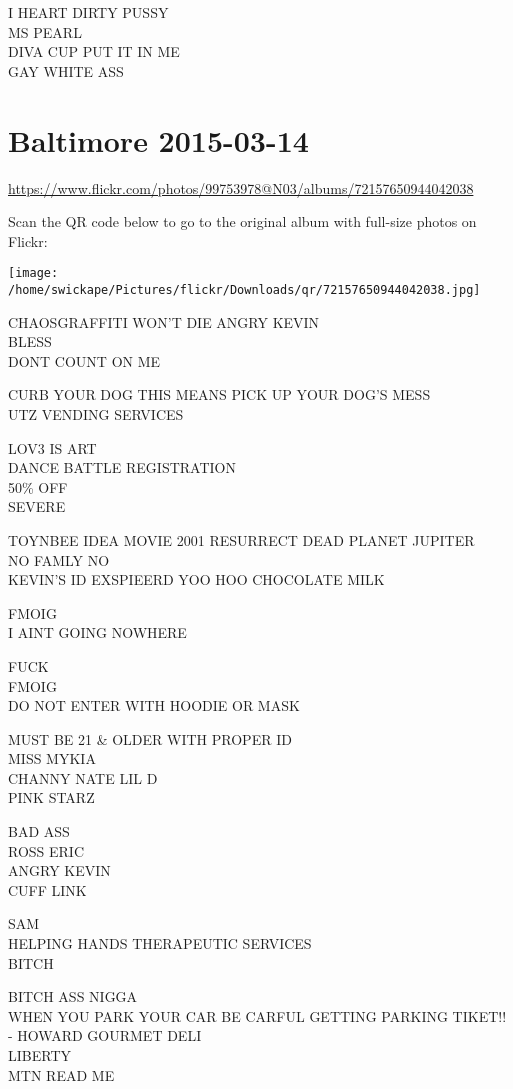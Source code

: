 \documentclass[10pt,letterpaper]{article}
\begin{document}
I HEART DIRTY PUSSY\\
MS PEARL\\
DIVA CUP PUT IT IN ME\\
GAY WHITE ASS
\pagebreak

\section*{Baltimore 2015-03-14}

\url{https://www.flickr.com/photos/99753978@N03/albums/72157650944042038}

Scan the QR code below to go to the original album with full-size photos on Flickr:

\texttt{[image: /home/swickape/Pictures/flickr/Downloads/qr/72157650944042038.jpg]}
\pagebreak

CHAOSGRAFFITI WON'T DIE ANGRY KEVIN\\
BLESS\\
DONT COUNT ON ME

CURB YOUR DOG THIS MEANS PICK UP YOUR DOG'S MESS\\
UTZ VENDING SERVICES

LOV3 IS ART\\
DANCE BATTLE REGISTRATION\\
50\% OFF\\
SEVERE

TOYNBEE IDEA MOVIE 2001 RESURRECT DEAD PLANET JUPITER\\
NO FAMLY NO\\
KEVIN'S ID EXSPIEERD YOO HOO CHOCOLATE MILK

FMOIG\\
I AINT GOING NOWHERE

FUCK\\
FMOIG\\
DO NOT ENTER WITH HOODIE OR MASK

MUST BE 21 \& OLDER WITH PROPER ID\\
MISS MYKIA\\
CHANNY NATE LIL D\\
PINK STARZ

BAD ASS\\
ROSS ERIC\\
ANGRY KEVIN\\
CUFF LINK

SAM\\
HELPING HANDS THERAPEUTIC SERVICES\\
BITCH

BITCH ASS NIGGA\\
WHEN YOU PARK YOUR CAR BE CARFUL GETTING PARKING TIKET!! {-} HOWARD GOURMET DELI\\
LIBERTY\\
MTN READ ME
\end{document}
